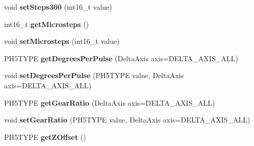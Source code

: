 \begin{DoxyCompactItemize}
\item 
\hypertarget{classfirestep_1_1_delta_calculator_ab7eb270ae8554e7ef6f9efcab24de66f}{void {\bfseries set\+Steps360} (int16\+\_\+t value)}\label{classfirestep_1_1_delta_calculator_ab7eb270ae8554e7ef6f9efcab24de66f}

\item 
\hypertarget{classfirestep_1_1_delta_calculator_afc14006dfbcc62af419ee229d02b5f8d}{int16\+\_\+t {\bfseries get\+Microsteps} ()}\label{classfirestep_1_1_delta_calculator_afc14006dfbcc62af419ee229d02b5f8d}

\item 
\hypertarget{classfirestep_1_1_delta_calculator_a7682d022faf4972ddf660a73aac9f187}{void {\bfseries set\+Microsteps} (int16\+\_\+t value)}\label{classfirestep_1_1_delta_calculator_a7682d022faf4972ddf660a73aac9f187}

\item 
\hypertarget{classfirestep_1_1_delta_calculator_ae085924ff3d7b30bd964cb2d859e87bc}{P\+H5\+T\+Y\+P\+E {\bfseries get\+Degrees\+Per\+Pulse} (Delta\+Axis axis=D\+E\+L\+T\+A\+\_\+\+A\+X\+I\+S\+\_\+\+A\+L\+L)}\label{classfirestep_1_1_delta_calculator_ae085924ff3d7b30bd964cb2d859e87bc}

\item 
\hypertarget{classfirestep_1_1_delta_calculator_aaf6fb3ea612af0e812a839ed8fa418d1}{void {\bfseries set\+Degrees\+Per\+Pulse} (P\+H5\+T\+Y\+P\+E value, Delta\+Axis axis=D\+E\+L\+T\+A\+\_\+\+A\+X\+I\+S\+\_\+\+A\+L\+L)}\label{classfirestep_1_1_delta_calculator_aaf6fb3ea612af0e812a839ed8fa418d1}

\item 
\hypertarget{classfirestep_1_1_delta_calculator_a2c9b8fec997c46b7ecf8057429cfd704}{P\+H5\+T\+Y\+P\+E {\bfseries get\+Gear\+Ratio} (Delta\+Axis axis=D\+E\+L\+T\+A\+\_\+\+A\+X\+I\+S\+\_\+\+A\+L\+L)}\label{classfirestep_1_1_delta_calculator_a2c9b8fec997c46b7ecf8057429cfd704}

\item 
\hypertarget{classfirestep_1_1_delta_calculator_a7713989f9ee80430dd2c234acee291bf}{void {\bfseries set\+Gear\+Ratio} (P\+H5\+T\+Y\+P\+E value, Delta\+Axis axis=D\+E\+L\+T\+A\+\_\+\+A\+X\+I\+S\+\_\+\+A\+L\+L)}\label{classfirestep_1_1_delta_calculator_a7713989f9ee80430dd2c234acee291bf}

\item 
\hypertarget{classfirestep_1_1_delta_calculator_aec00cba82f156e929d4245eca2f42116}{P\+H5\+T\+Y\+P\+E {\bfseries get\+Z\+Offset} ()}\label{classfirestep_1_1_delta_calculator_aec00cba82f156e929d4245eca2f42116}


\end{DoxyCompactItemize}
